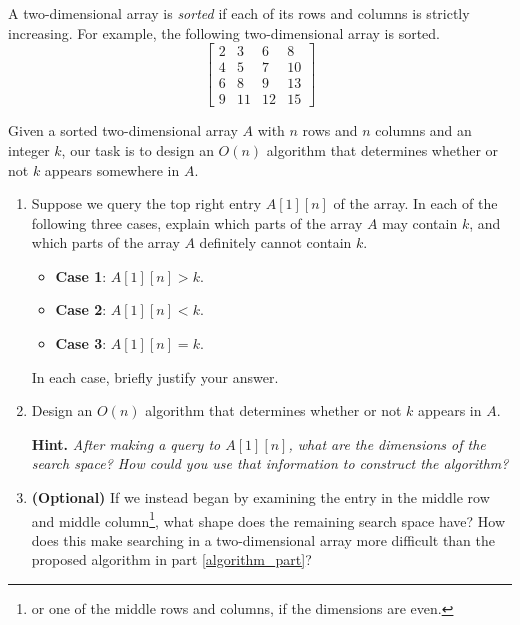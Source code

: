 \documentclass[12pt]{article}
\begin{document}

\begin{question}
A two-dimensional array is \emph{sorted} if each of its rows and columns is strictly increasing. For example, the following two-dimensional array is sorted.
\[\begin{bmatrix}
    2 & 3 & 6 & 8 \\
    4 & 5 & 7 & 10 \\
    6 & 8 & 9 & 13 \\
    9 & 11 & 12 & 15
\end{bmatrix}\]

Given a sorted two-dimensional array $A$ with $n$ rows and $n$ columns and an integer $k$, our task is to design an $O(n)$ algorithm that determines whether or not $k$ appears somewhere in $A$.

\begin{enumerate}
    \item Suppose we query the top right entry $A[1][n]$ of the array. In each of the following three cases, explain which parts of the array $A$ may contain $k$, and which parts of the array $A$ definitely cannot contain $k$.
    \begin{itemize}
        \item {\bfseries Case 1}: $A[1][n] > k$.
        \item {\bfseries Case 2}: $A[1][n] < k$.
        \item {\bfseries Case 3}: $A[1][n] = k$.
    \end{itemize}

    In each case, briefly justify your answer.

    \item \label{algorithm_part} Design an $O(n)$ algorithm that determines whether or not $k$ appears in $A$.

    {\bfseries Hint.} \emph{After making a query to $A[1][n]$, what are the dimensions of the search space? How could you use that information to construct the algorithm?}

    \item \textbf{(Optional)} If we instead began by examining the entry in the middle row and middle column\footnote{or one of the middle rows and columns, if the dimensions are even.}, what shape does the remaining search space have? How does this make searching in a two-dimensional array more difficult than the proposed algorithm in part \ref{algorithm_part}?
\end{enumerate}
\end{question}
\end{document}
